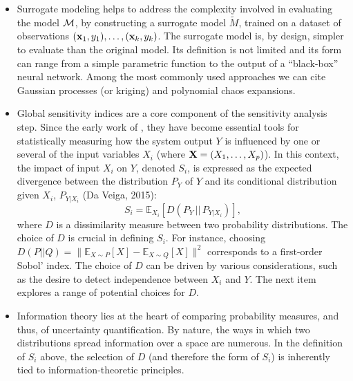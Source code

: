 \begin{itemize}
    \item Surrogate modeling helps to address the complexity involved in evaluating the model $\mathcal{M}$, by constructing a surrogate model $\tilde{M}$, trained on a dataset of observations $(\mathbf{x}_1, y_1), \ldots, (\mathbf{x}_k, y_k)$. The surrogate model is, by design, simpler to evaluate than the original model. Its definition is not limited and its form can range from a simple parametric function to the output of a ``black-box'' neural network. Among the most commonly used approaches we can cite Gaussian processes (or kriging) and polynomial chaos expansions.
    \item Global sensitivity indices are a core component of the sensitivity analysis step. Since the early work of \citet{sobol_sensitivity_1993}, they have become essential tools for statistically measuring how the system output $Y$ is influenced by one or several of the input variables $X_i$ (where $\mathbf{X} = (X_1, \ldots, X_p)$). In this context, the impact of input $X_i$ on $Y$, denoted $S_i$, is expressed as the expected divergence between the distribution $P_Y$ of $Y$ and its conditional distribution given $X_i$, $P_{Y|X_i}$ (Da Veiga, 2015):
\begin{equation}
    S_i = \mathbb{E}_{X_i}[D(P_Y \,||\, P_{Y|X_i})],
\end{equation}
    where $D$ is a dissimilarity measure between two probability distributions. The choice of $D$ is crucial in defining $S_i$. For instance, choosing $D(P||Q) = \| \mathbb{E}_{X \sim P}[X] - \mathbb{E}_{X \sim Q}[X] \|^2$ corresponds to a first-order Sobol’ index. The choice of $D$ can be driven by various considerations, such as the desire to detect independence between $X_i$ and $Y$. The next item explores a range of potential choices for $D$.
    \item  Information theory lies at the heart of comparing probability measures, and thus, of uncertainty quantification. By nature, the ways in which two distributions spread information over a space are numerous. In the definition of $S_i$ above, the selection of $D$ (and therefore the form of $S_i$) is inherently tied to information-theoretic principles.
    

\end{itemize}
